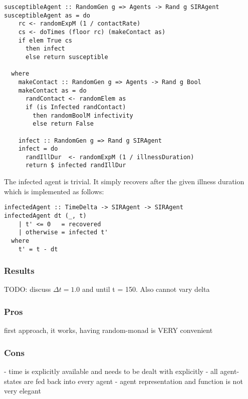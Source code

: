 \begin{verbatim}
susceptibleAgent :: RandomGen g => Agents -> Rand g SIRAgent
susceptibleAgent as = do
    rc <- randomExpM (1 / contactRate)
    cs <- doTimes (floor rc) (makeContact as)
    if elem True cs
      then infect
      else return susceptible

  where
    makeContact :: RandomGen g => Agents -> Rand g Bool
    makeContact as = do
      randContact <- randomElem as
      if (is Infected randContact)
        then randomBoolM infectivity
        else return False

    infect :: RandomGen g => Rand g SIRAgent
    infect = do
      randIllDur  <- randomExpM (1 / illnessDuration)
      return $ infected randIllDur
\end{verbatim}

The infected agent is trivial. It simply recovers after the given illness duration which is implemented as follows:

\begin{verbatim}
infectedAgent :: TimeDelta -> SIRAgent -> SIRAgent
infectedAgent dt (_, t) 
    | t' <= 0   = recovered
    | otherwise = infected t'
  where
    t' = t - dt  
\end{verbatim}

\subsubsection{Results}
TODO: discuss $\Delta t = 1.0$ and until t = 150. Also cannot vary delta

\subsubsection{Pros}
first approach, it works, having random-monad is VERY convenient

\subsubsection{Cons}
- time is explicitly available and needs to be dealt with explicitly
- all agent-states are fed back into every agent
- agent representation and function is not very elegant 
